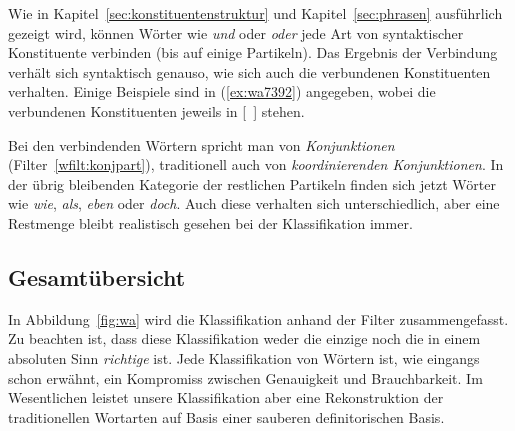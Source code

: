 
Wie in Kapitel~\ref{sec:konstituentenstruktur} und Kapitel~\ref{sec:phrasen} ausführlich gezeigt wird, können Wörter wie \textit{und} oder \textit{oder} jede Art von syntaktischer Konstituente verbinden (bis auf einige Partikeln).
Das Ergebnis der Verbindung verhält sich syntaktisch genauso, wie sich auch die verbundenen Konstituenten verhalten.
Einige Beispiele sind in (\ref{ex:wa7392}) angegeben, wobei die verbundenen Konstituenten jeweils in [~] stehen.

\begin{exe}
  \ex\label{ex:wa7392} 
  \begin{xlist}
  \end{xlist}
\end{exe}

Bei den verbindenden Wörtern spricht man von \textit{Konjunktionen} (Filter~\ref{wfilt:konjpart}), traditionell auch von \textit{koordinierenden Konjunktionen}.
In der übrig bleibenden Kategorie der restlichen Partikeln finden sich jetzt Wörter wie \textit{wie}, \textit{als}, \textit{eben} oder \textit{doch}.
Auch diese verhalten sich unterschiedlich, aber eine Restmenge bleibt realistisch gesehen bei der Klassifikation immer.


\subsection{Gesamtübersicht}

\label{sec:gesamtuebersichtwortklassen}

In Abbildung~\ref{fig:wa} wird die Klassifikation anhand der Filter zusammengefasst.
Zu beachten ist, dass diese Klassifikation weder die einzige noch die in einem absoluten Sinn \textit{richtige} ist.
Jede Klassifikation von Wörtern ist, wie eingangs schon erwähnt, ein Kompromiss zwischen Genauigkeit und Brauchbarkeit.
Im Wesentlichen leistet unsere Klassifikation aber eine Rekonstruktion der traditionellen Wortarten auf Basis einer sauberen definitorischen Basis.

\newcommand{\Bjn}{\B{dl}_{\textnormal{Ja}}\B{dr}^{\textnormal{Nein}}}
\newcommand{\Bjnd}{\B{dll}_{\textnormal{Ja}}\B{drr}^{\textnormal{Nein}}}

